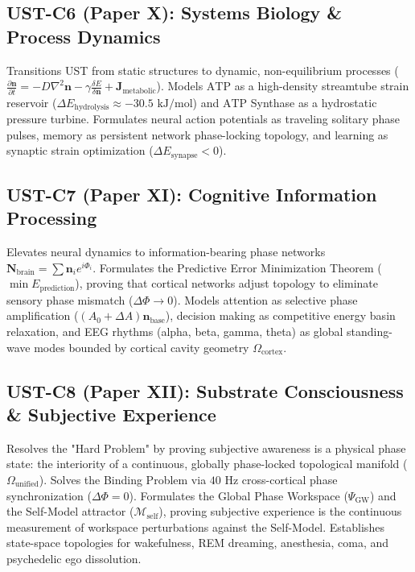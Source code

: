 \documentclass[11pt,a4paper]{article}
\begin{document}
	\subsection{UST-C6 (Paper X): Systems Biology \& Process Dynamics}
	Transitions UST from static structures to dynamic, non-equilibrium processes ($\frac{\partial \mathbf{n}}{\partial t} = -D\nabla^2 \mathbf{n} - \gamma \frac{\delta E}{\delta \mathbf{n}} + \mathbf{J}_{\text{metabolic}}$). Models $\text{ATP}$ as a high-density streamtube strain reservoir ($\Delta E_{\text{hydrolysis}} \approx -30.5 \text{ kJ/mol}$) and $\text{ATP}$ Synthase as a hydrostatic pressure turbine. Formulates neural action potentials as traveling solitary phase pulses, memory as persistent network phase-locking topology, and learning as synaptic strain optimization ($\Delta E_{\text{synapse}} < 0$).
	
	\subsection{UST-C7 (Paper XI): Cognitive Information Processing}
	Elevates neural dynamics to information-bearing phase networks $\mathbf{N}_{\text{brain}} = \sum \mathbf{n}_i e^{i\Phi_i}$. Formulates the Predictive Error Minimization Theorem ($\min E_{\text{prediction}}$), proving that cortical networks adjust topology to eliminate sensory phase mismatch ($\Delta \Phi \to 0$). Models attention as selective phase amplification ($(A_0 + \Delta A)\mathbf{n}_{\text{base}}$), decision making as competitive energy basin relaxation, and EEG rhythms (alpha, beta, gamma, theta) as global standing-wave modes bounded by cortical cavity geometry $\Omega_{\text{cortex}}$.
	
	\subsection{UST-C8 (Paper XII): Substrate Consciousness \& Subjective Experience}
	Resolves the "Hard Problem" by proving subjective awareness is a physical phase state: the interiority of a continuous, globally phase-locked topological manifold ($\Omega_{\text{unified}}$). Solves the Binding Problem via $40 \text{ Hz}$ cross-cortical phase synchronization ($\Delta \Phi = 0$). Formulates the Global Phase Workspace ($\Psi_{\text{GW}}$) and the Self-Model attractor ($\mathcal{M}_{\text{self}}$), proving subjective experience is the continuous measurement of workspace perturbations against the Self-Model. Establishes state-space topologies for wakefulness, REM dreaming, anesthesia, coma, and psychedelic ego dissolution.
	
\end{document}
